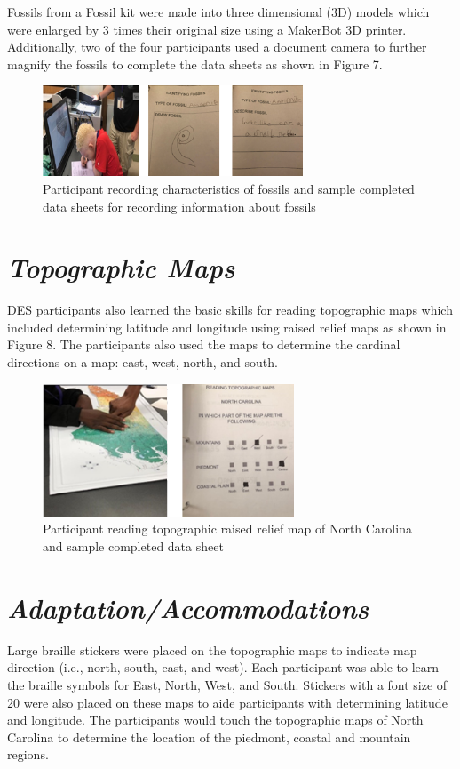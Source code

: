 \documentclass[11.5pt]{sig-alternate}
\begin{document}
\begin{large}
 Fossils from a Fossil kit were made into three dimensional (3D) models which were enlarged by 3 times their original size using a MakerBot 3D printer.  Additionally, two of the four participants used a document camera to further magnify the fossils to complete the data sheets as shown in Figure 7.
{\begin{figure}[htp] 
  \renewcommand{\thefigure}{7}
    \centering
    \includegraphics[width=7.75cm]{figure7.png}
    \caption{Participant recording characteristics of fossils and sample completed data sheets for recording information about fossils }
    \label{ Participant recording characteristics of fossils and sample completed data sheets for recording information about fossils }
\end{figure}
}


\section*{\textit{Topographic Maps}}
DES participants also learned the basic skills for reading topographic maps which included determining latitude and longitude using raised relief maps as shown in Figure 8. The participants also used the maps to determine the cardinal directions on a map: east, west, north, and south.  

{\begin{figure}[htp] 
  \renewcommand{\thefigure}{8}
    \centering
    \includegraphics[width=7.5cm]{figure8.png}
    \caption{Participant reading topographic raised relief map of North Carolina and sample completed data sheet }
    \label{ Participant reading topographic raised relief map of North Carolina and sample completed data sheet  }
\end{figure}
}
\section*{\textit{Adaptation/Accommodations}}
Large braille stickers were placed on the topographic maps to indicate map direction  (i.e., north, south, east, and west).  Each participant was able to learn the braille symbols for East, North, West, and South.  Stickers with a font size of 20 were also placed on these maps to aide participants with determining latitude and longitude. The participants would touch the topographic maps of North Carolina to determine the location of the piedmont, coastal and mountain regions.


\end{large}
\end{document}
